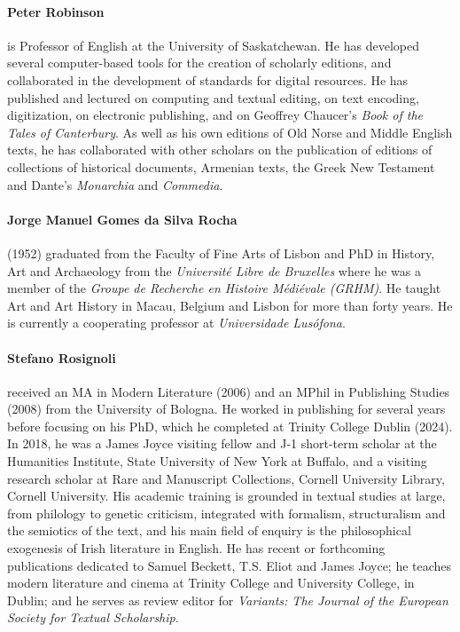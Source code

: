 \paragraph{Peter Robinson} is Professor of English at the University of
Saskatchewan. He has developed several computer-based tools for the
creation of scholarly editions, and collaborated in the development of
standards for digital resources. He has published and lectured on
computing and textual editing, on text encoding, digitization, on
electronic publishing, and on Geoffrey Chaucer's \emph{Book of the Tales
of Canterbury}. As well as his own editions of Old Norse and Middle
English texts, he has collaborated with other scholars on the
publication of editions of collections of historical documents, Armenian
texts, the Greek New Testament and Dante's \emph{Monarchia} and
\emph{Commedia}.

\paragraph{Jorge Manuel Gomes da Silva Rocha} (1952) graduated from the Faculty of Fine Arts of Lisbon and PhD in History, Art and Archaeology from the \textit{Université Libre de Bruxelles} where he was a member of the \textit{Groupe de Recherche en Histoire Médiévale (GRHM)}. He taught Art and Art History in Macau, Belgium and Lisbon for more than forty years. He is currently a cooperating professor at \textit{Universidade Lusófona}.

\paragraph{Stefano Rosignoli} received an MA in Modern Literature (2006) and an MPhil in Publishing Studies (2008) from the University of Bologna. He worked in publishing for several years before focusing on his PhD, which he completed at Trinity College Dublin (2024). In 2018, he was a James Joyce visiting fellow and J-1 short-term scholar at the Humanities Institute, State University of New York at Buffalo, and a visiting research scholar at Rare and Manuscript Collections, Cornell University Library, Cornell University. His academic training is grounded in textual studies at large, from philology to genetic criticism, integrated with formalism, structuralism and the semiotics of the text, and his main field of enquiry is the philosophical exogenesis of Irish literature in English. He has recent or forthcoming publications dedicated to Samuel Beckett, T.S. Eliot and James Joyce; he teaches modern literature and cinema at Trinity College and University College, in Dublin; and he serves as review editor for \emph{Variants: The Journal of the European Society for Textual Scholarship}.


